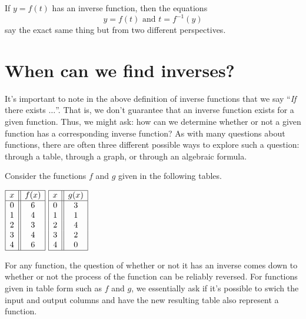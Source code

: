\documentclass[nooutcomes]{ximera}
\begin{document}
If $y = f(t)$ has an inverse function, then the equations
$$
y = f(t) \text{ and } t = f^{-1}(y)
$$
say the exact same thing but from two different perspectives. 


\section{When can we find inverses?}
 It's important to note in the above definition of inverse functions that we say ``\emph{If} there exists $\ldots$''.  That is, we don't guarantee that an inverse function exists for a given function.  Thus, we might ask: how can we determine whether or not a given function has a corresponding inverse function?  As with many questions about functions, there are often three different possible ways to explore such a question:  through a table, through a graph, or through an algebraic formula.

Consider the functions $f$ and $g$ given in the following tables. 

\begin{center}
\(
\begin{array}{ |c || c|  }
 \hline
 x & f(x)\\
 \hline
 0&6\\
 1&4\\
 2&3\\
 3&4\\
 4&6\\
 \hline
\end{array} 
\)
\hspace{2cm}
\(
\begin{array}{ |c || c|  }
 \hline
 x & g(x)\\
 \hline
 0&3\\
 1&1\\
 2&4\\
 3&2\\
 4&0\\
 \hline
\end{array} 
\)
\end{center}

For any function, the question of whether or not it has an inverse comes down to whether or not the process of the function can be reliably reversed.  For functions given in table form such as $f$ and $g$, we essentially ask if it's possible to swich the input and output columns and have the new resulting table also represent a function.
\end{document}
